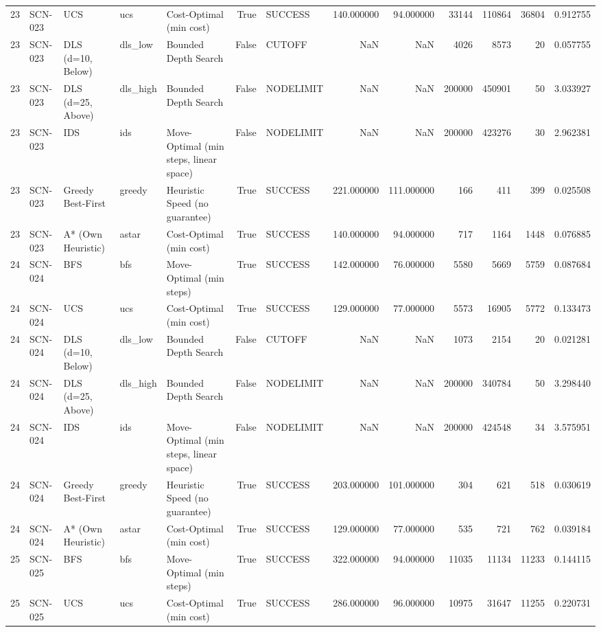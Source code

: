 \begin{table}[htbp]
\begin{tabular}{rllllrlrrrrrr}
23 & SCN-023 & UCS & ucs & Cost-Optimal (min cost) & True & SUCCESS & 140.000000 & 94.000000 & 33144 & 110864 & 36804 & 0.912755 \\
23 & SCN-023 & DLS (d=10, Below) & dls\_low & Bounded Depth Search & False & CUTOFF & NaN & NaN & 4026 & 8573 & 20 & 0.057755 \\
23 & SCN-023 & DLS (d=25, Above) & dls\_high & Bounded Depth Search & False & NODELIMIT & NaN & NaN & 200000 & 450901 & 50 & 3.033927 \\
23 & SCN-023 & IDS & ids & Move-Optimal (min steps, linear space) & False & NODELIMIT & NaN & NaN & 200000 & 423276 & 30 & 2.962381 \\
23 & SCN-023 & Greedy Best-First & greedy & Heuristic Speed (no guarantee) & True & SUCCESS & 221.000000 & 111.000000 & 166 & 411 & 399 & 0.025508 \\
23 & SCN-023 & A* (Own Heuristic) & astar & Cost-Optimal (min cost) & True & SUCCESS & 140.000000 & 94.000000 & 717 & 1164 & 1448 & 0.076885 \\
24 & SCN-024 & BFS & bfs & Move-Optimal (min steps) & True & SUCCESS & 142.000000 & 76.000000 & 5580 & 5669 & 5759 & 0.087684 \\
24 & SCN-024 & UCS & ucs & Cost-Optimal (min cost) & True & SUCCESS & 129.000000 & 77.000000 & 5573 & 16905 & 5772 & 0.133473 \\
24 & SCN-024 & DLS (d=10, Below) & dls\_low & Bounded Depth Search & False & CUTOFF & NaN & NaN & 1073 & 2154 & 20 & 0.021281 \\
24 & SCN-024 & DLS (d=25, Above) & dls\_high & Bounded Depth Search & False & NODELIMIT & NaN & NaN & 200000 & 340784 & 50 & 3.298440 \\
24 & SCN-024 & IDS & ids & Move-Optimal (min steps, linear space) & False & NODELIMIT & NaN & NaN & 200000 & 424548 & 34 & 3.575951 \\
24 & SCN-024 & Greedy Best-First & greedy & Heuristic Speed (no guarantee) & True & SUCCESS & 203.000000 & 101.000000 & 304 & 621 & 518 & 0.030619 \\
24 & SCN-024 & A* (Own Heuristic) & astar & Cost-Optimal (min cost) & True & SUCCESS & 129.000000 & 77.000000 & 535 & 721 & 762 & 0.039184 \\
25 & SCN-025 & BFS & bfs & Move-Optimal (min steps) & True & SUCCESS & 322.000000 & 94.000000 & 11035 & 11134 & 11233 & 0.144115 \\
25 & SCN-025 & UCS & ucs & Cost-Optimal (min cost) & True & SUCCESS & 286.000000 & 96.000000 & 10975 & 31647 & 11255 & 0.220731 \\

\end{tabular}
\end{table}
